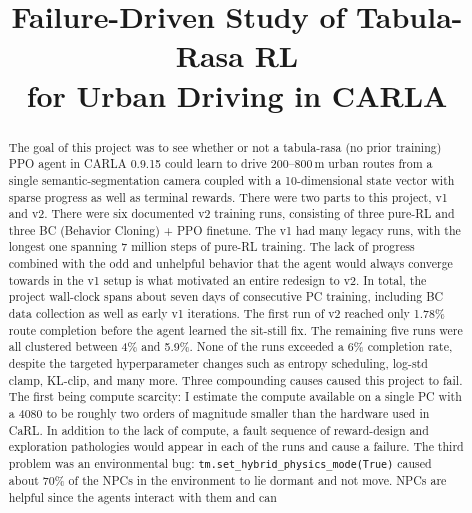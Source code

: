 \documentclass[conference]{IEEEtran}
\begin{document}
\title{Failure-Driven Study of Tabula-Rasa RL\\
       for Urban Driving in CARLA}

\author{
}

\maketitle

\begin{abstract}
The goal of this project was to see whether or not a tabula-rasa
(no prior training) PPO agent in CARLA 0.9.15 could learn to drive
200--800\,m urban routes from a single semantic-segmentation
camera coupled with a 10-dimensional state vector with sparse
progress as well as terminal rewards. There were two parts to
this project, v1 and v2. There were six documented v2 training
runs, consisting of three pure-RL and three BC (Behavior Cloning)
+ PPO finetune. The v1 had many legacy runs, with the longest one
spanning 7 million steps of pure-RL training. The lack of
progress combined with the odd and unhelpful behavior that the
agent would always converge towards in the v1 setup is what
motivated an entire redesign to v2. In total, the project
wall-clock spans about seven days of consecutive PC training,
including BC data collection as well as early v1 iterations.
The first run of v2 reached only 1.78\% route completion before
the agent learned the sit-still fix. The remaining five runs
were all clustered between 4\% and 5.9\%. None of the runs
exceeded a 6\% completion rate, despite the targeted
hyperparameter changes such as entropy scheduling, log-std
clamp, KL-clip, and many more. Three compounding causes caused
this project to fail. The first being compute scarcity: I
estimate the compute available on a single PC with a 4080 to be
roughly two orders of magnitude smaller than the hardware used
in CaRL. In addition to the lack of compute, a fault
sequence of reward-design and exploration pathologies would
appear in each of the runs and cause a failure. The third
problem was an environmental bug:
\texttt{tm.set\_hybrid\_physics\_mode(True)} caused about 70\%
of the NPCs in the environment to lie dormant and not move.
NPCs are helpful since the agents interact with them and can

\end{abstract}
\end{document}
